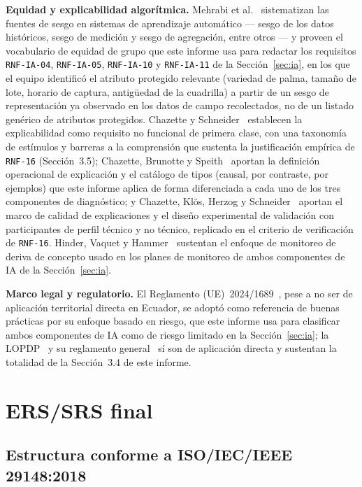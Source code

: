 \documentclass[11pt,a4paper]{article}
\newcommand{\id}[1]{\texttt{#1}}
\begin{document}
\textbf{Equidad y explicabilidad algorítmica.} Mehrabi et al.~\cite{mehrabi2021} sistematizan las
fuentes de sesgo en sistemas de aprendizaje automático --- sesgo de los datos históricos, sesgo de
medición y sesgo de agregación, entre otros --- y proveen el vocabulario de equidad de grupo que
este informe usa para redactar los requisitos \id{RNF-IA-04}, \id{RNF-IA-05}, \id{RNF-IA-10} y
\id{RNF-IA-11} de la Sección~\ref{sec:ia}, en los que el equipo identificó el atributo protegido
relevante (variedad de palma, tamaño de lote, horario de captura, antigüedad de la cuadrilla) a
partir de un sesgo de representación ya observado en los datos de campo recolectados, no de un
listado genérico de atributos protegidos. Chazette y Schneider~\cite{chazette2020} establecen la
explicabilidad como requisito no funcional de primera clase, con una taxonomía de estímulos y
barreras a la comprensión que sustenta la justificación empírica de \id{RNF-16}
(Sección~3.5); Chazette, Brunotte y Speith~\cite{chazette2021} aportan la definición operacional de
explicación y el catálogo de tipos (causal, por contraste, por ejemplos) que este informe aplica de
forma diferenciada a cada uno de los tres componentes de diagnóstico; y Chazette, Klös, Herzog y
Schneider~\cite{chazette2022} aportan el marco de calidad de explicaciones y el diseño experimental
de validación con participantes de perfil técnico y no técnico, replicado en el criterio de
verificación de \id{RNF-16}. Hinder, Vaquet y Hammer~\cite{hinder2024} sustentan el enfoque de
monitoreo de deriva de concepto usado en los planes de monitoreo de ambos componentes de IA de la
Sección~\ref{sec:ia}.

\textbf{Marco legal y regulatorio.} El Reglamento (UE)~2024/1689~\cite{euaiact2024}, pese a no ser
de aplicación territorial directa en Ecuador, se adoptó como referencia de buenas prácticas por su
enfoque basado en riesgo, que este informe usa para clasificar ambos componentes de IA como de
riesgo limitado en la Sección~\ref{sec:ia}; la LOPDP~\cite{lopdp2021} y su reglamento
general~\cite{lopdp_rgl2023} sí son de aplicación directa y sustentan la totalidad de la
Sección~3.4 de este informe.

\section{ERS/SRS final}
\label{sec:ers}

\subsection{Estructura conforme a ISO/IEC/IEEE 29148:2018}
\end{document}
